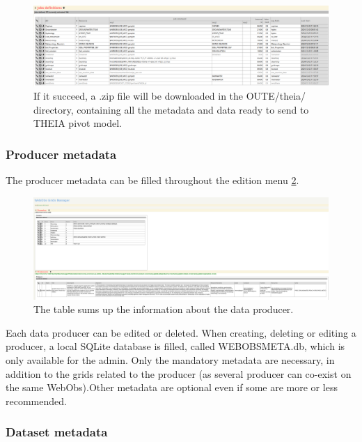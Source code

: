 \begin{figure}[!h]
	\centering
	\includegraphics[scale=0.25]{figures/theia/sendTHEIA.png}
	\caption{If it succeed, a .zip file will be downloaded in the OUTE/theia/ directory, containing all the metadata and data ready to send to THEIA pivot model.}
	\label{sendTHEIA}
\end{figure}

\subsubsection{Producer metadata}

The producer metadata can be filled throughout the  edition menu \ref{gridsMgr}.

\begin{figure}[!h]
	\centering
	\includegraphics[width=\textwidth]{figures/theia/gridsMgr.png}
	\caption{The table sums up the information about the data producer.}
	\label{gridsMgr}
\end{figure}

Each data producer can be edited or deleted. When creating, deleting or editing a producer, a local SQLite database is filled, called WEBOBSMETA.db, which is only available for the admin. Only the mandatory metadata are necessary, in addition to the grids related to the producer (as several producer can co-exist on the same WebObs).Other metadata are optional even if some are more or less recommended.

\subsubsection{Dataset metadata}

